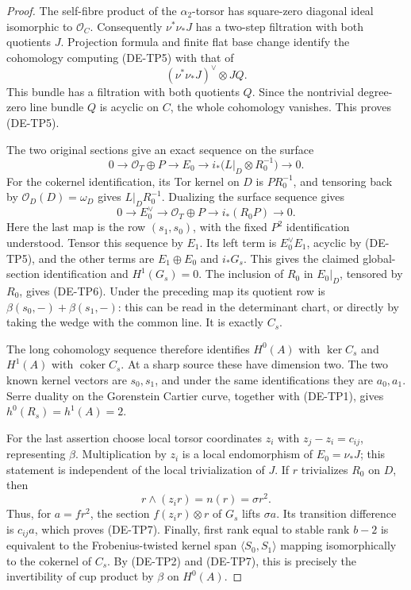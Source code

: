 \begin{proof}
The self-fibre product of the $\alpha_2$-torsor has square-zero
diagonal ideal isomorphic to $\mathcal O_C$. Consequently
$\nu^*\nu_*J$ has a two-step filtration with both quotients $J$.
Projection formula and finite flat base change identify the cohomology
computing (DE-TP5) with that of
\[
                  (\nu^*\nu_*J)^\vee\otimes JQ.
\]
This bundle has a filtration with both quotients $Q$. Since the
nontrivial degree-zero line bundle $Q$ is acyclic on $C$, the
whole cohomology vanishes. This proves (DE-TP5).

The two original sections give an exact sequence on the surface
\[
 0\longrightarrow\mathcal O_T\oplus P\longrightarrow E_0
       \longrightarrow i_*\bigl(L|_D\otimes R_0^{-1}\bigr)
       \longrightarrow0.
\]
For the cokernel identification, its Tor kernel on $D$ is
$P R_0^{-1}$, and tensoring back by $\mathcal O_D(D)=\omega_D$
gives $L|_D R_0^{-1}$. Dualizing the surface sequence gives
\[
 0\longrightarrow E_0^\vee\longrightarrow\mathcal O_T\oplus P
        \longrightarrow i_*(R_0P)\longrightarrow0.
\]
Here the last map is the row $(s_1,s_0)$, with the fixed
$P^2$ identification understood. Tensor this sequence by $E_1$.
Its left term is $E_0^\vee E_1$, acyclic by (DE-TP5), and the
other terms are $E_1\oplus E_0$ and $i_*G_s$. This gives the
claimed global-section identification and $H^1(G_s)=0$.
The inclusion of $R_0$ in $E_0|_D$, tensored by $R_0$, gives
(DE-TP6). Under the preceding map its quotient row is
$\beta(s_0,-)+\beta(s_1,-)$: this can be read in the determinant
chart, or directly by taking the wedge with the common line.
It is exactly $C_s$.

The long cohomology sequence therefore identifies $H^0(A)$
with $\ker C_s$ and $H^1(A)$ with $\operatorname{coker}C_s$.
At a sharp source these have dimension two. The two known
kernel vectors are $s_0,s_1$, and under the same identifications
they are $a_0,a_1$. Serre duality on the Gorenstein Cartier curve,
together with (DE-TP1), gives $h^0(R_s)=h^1(A)=2$.

For the last assertion choose local torsor coordinates $z_i$
with $z_j-z_i=c_{ij}$, representing $\beta$. Multiplication by
$z_i$ is a local endomorphism of $E_0=\nu_*J$; this statement
is independent of the local trivialization of $J$.
If $r$ trivializes $R_0$ on $D$, then
\[
                   r\wedge(z_i r)=n(r)=\sigma r^2.
\]
Thus, for $a=f r^2$, the section $f(z_i r)\otimes r$ of $G_s$
lifts $\sigma a$. Its transition difference is $c_{ij}a$,
which proves (DE-TP7). Finally, first rank equal to stable rank
$b-2$ is equivalent to the Frobenius-twisted kernel span
$\langle S_0,S_1\rangle$ mapping isomorphically to the cokernel
of $C_s$. By (DE-TP2) and (DE-TP7), this is precisely the
invertibility of cup product by $\beta$ on $H^0(A)$.
\end{proof}

